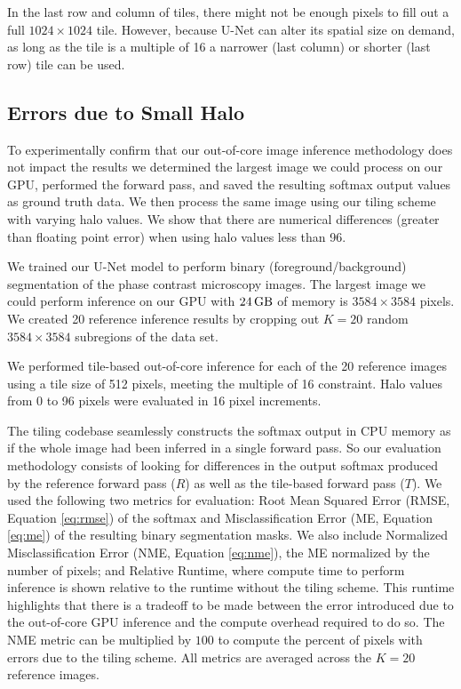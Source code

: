 \documentclass[twoside,11pt]{article}
\begin{document}
In the last row and column of tiles, there might not be enough pixels to fill out a full $1024 \times 1024$ tile. However, because U-Net can alter its spatial size on demand, as long as the tile is a multiple of 16 a narrower (last column) or shorter (last row) tile can be used. 


\subsection{Errors due to Small Halo}

To experimentally confirm that our out-of-core image inference methodology does not impact the results we determined the largest image we could process on our GPU, performed the forward pass, and saved the resulting softmax output values as ground truth data. We then process the same image using our tiling scheme with varying halo values. We show that there are numerical differences (greater than floating point error) when using halo values less than 96. 

We trained our U-Net model to perform binary (foreground/background) segmentation of the phase contrast microscopy images. The largest image we could perform inference on our GPU with $\SI{24}{\giga\byte}$ of memory is $3584 \times 3584$ pixels. We created 20 reference inference results by cropping out $K = 20$ random $3584 \times 3584$ subregions of the data set. 

We performed tile-based out-of-core inference for each of the 20 reference images using a tile size of 512 pixels, meeting the multiple of 16 constraint. Halo values from 0 to 96 pixels were evaluated in 16 pixel increments. 

The tiling codebase seamlessly constructs the softmax output in CPU memory as if the whole image had been inferred in a single forward pass. So our evaluation methodology consists of looking for differences in the output softmax produced by the reference forward pass ($R$) as well as the tile-based forward pass ($T$). We used the following two metrics for evaluation: Root Mean Squared Error (RMSE, Equation \ref{eq:rmse}) of the softmax and Misclassification Error (ME, Equation \ref{eq:me}) of the resulting binary segmentation masks. %
We also include Normalized Misclassification Error (NME, Equation \ref{eq:nme}), the ME normalized by the number of pixels; and Relative Runtime, where compute time to perform inference is shown relative to the runtime without the tiling scheme. This runtime highlights that there is a tradeoff to be made between the error introduced due to the out-of-core GPU inference and the compute overhead required to do so. The NME metric can be multiplied by $100$ to compute the percent of pixels with errors due to the tiling scheme.
All metrics are averaged across the $K = 20$ reference images.
\end{document}
